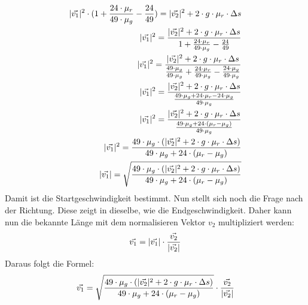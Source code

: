 \begin{align}
    \lvert \vec{v_1} \rvert^2 \cdot (1 + \frac{24 \cdot \mu_r}{49 \cdot \mu_g} - \frac{24}{49}) = \lvert \vec{v_2} \rvert^2 + 2 \cdot g \cdot \mu_r \cdot \Delta s\\
    \lvert \vec{v_1} \rvert^2 = \frac{\lvert \vec{v_2} \rvert^2 + 2 \cdot g \cdot \mu_r \cdot \Delta s}{1 + \frac{24 \cdot \mu_r}{49 \cdot \mu_g} - \frac{24}{49}}\\
    \lvert \vec{v_1} \rvert^2 = \frac{\lvert \vec{v_2} \rvert^2 + 2 \cdot g \cdot \mu_r \cdot \Delta s}{\frac{49 \cdot \mu_g}{49 \cdot \mu_g} + \frac{24 \cdot \mu_r}{49 \cdot \mu_g} - \frac{24 \cdot \mu_g}{49 \cdot \mu_g}}\\
    \lvert \vec{v_1} \rvert^2 = \frac{\lvert \vec{v_2} \rvert^2 + 2 \cdot g \cdot \mu_r \cdot \Delta s}{\frac{49 \cdot \mu_g + 24 \cdot \mu_r - 24 \cdot \mu_g}{49 \cdot \mu_g}}\\
    \lvert \vec{v_1} \rvert^2 = \frac{\lvert \vec{v_2} \rvert^2 + 2 \cdot g \cdot \mu_r \cdot \Delta s}{\frac{49 \cdot \mu_g + 24 \cdot (\mu_r - \mu_g)}{49 \cdot \mu_g}}\\
    \lvert \vec{v_1} \rvert^2 = \frac{49 \cdot \mu_g \cdot (\lvert \vec{v_2} \rvert^2 + 2 \cdot g \cdot \mu_r \cdot \Delta s)}{49 \cdot \mu_g + 24 \cdot (\mu_r - \mu_g)}\\
    \lvert \vec{v_1} \rvert = \sqrt{\frac{49 \cdot \mu_g \cdot (\lvert \vec{v_2} \rvert^2 + 2 \cdot g \cdot \mu_r \cdot \Delta s)}{49 \cdot \mu_g + 24 \cdot (\mu_r - \mu_g)}}
\end{align}
Damit ist die Startgeschwindigkeit bestimmt. Nun stellt sich noch die Frage nach der Richtung. Diese zeigt in dieselbe,
wie die Endgeschwindigkeit. Daher kann nun die bekannte Länge mit dem normalisieren Vektor $v_2$ multipliziert
werden:
\begin{align}
    \vec{v_1} = \lvert \vec{v_1} \rvert \cdot \frac{\vec{v_2}}{\lvert \vec{v_2} \rvert}
\end{align}
Daraus folgt die Formel:
\begin{align}
    \vec{v_1} = \sqrt{\frac{49 \cdot \mu_g \cdot (\lvert \vec{v_2} \rvert^2 + 2 \cdot g \cdot \mu_r \cdot \Delta s)}{49 \cdot \mu_g + 24 \cdot (\mu_r - \mu_g)}} \cdot \frac{\vec{v_2}}{\lvert \vec{v_2} \rvert}
\end{align}
